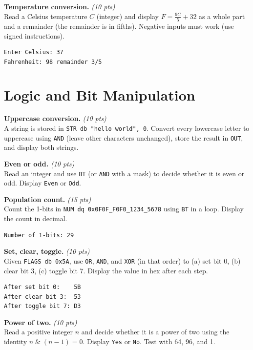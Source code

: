 \documentclass[11pt,letterpaper]{article}
\newcommand{\pts}[1]{\hfill\textit{(#1 pts)}}
\newcommand{\ttl}[1]{\textbf{#1.}}
\begin{document}
\begin{problems}
\item \ttl{Temperature conversion} \pts{10}
\\Read a Celsius temperature $C$ (integer) and display $F = \frac{9C}{5} + 32$ as a whole part and a remainder (the remainder is in fifths). Negative inputs must work (use signed instructions).
\begin{lstlisting}[style=out]
Enter Celsius: 37
Fahrenheit: 98 remainder 3/5
\end{lstlisting}

\end{problems}

\section{Logic and Bit Manipulation}

\begin{problems}

\item \ttl{Uppercase conversion} \pts{10}
\\A string is stored in \texttt{STR db "hello world", 0}. Convert every lowercase letter to uppercase using \texttt{AND} (leave other characters unchanged), store the result in \texttt{OUT}, and display both strings.

\item \ttl{Even or odd} \pts{10}
\\Read an integer and use \texttt{BT} (or \texttt{AND} with a mask) to decide whether it is even or odd. Display \texttt{Even} or \texttt{Odd}.

\item \ttl{Population count} \pts{15}
\\Count the 1-bits in \texttt{NUM dq 0x0F0F\_F0F0\_1234\_5678} using \texttt{BT} in a loop. Display the count in decimal.
\begin{lstlisting}[style=out]
Number of 1-bits: 29
\end{lstlisting}

\item \ttl{Set, clear, toggle} \pts{10}
\\Given \texttt{FLAGS db 0x5A}, use \texttt{OR}, \texttt{AND}, and \texttt{XOR} (in that order) to (a) set bit 0, (b) clear bit 3, (c) toggle bit 7. Display the value in hex after each step.
\begin{lstlisting}[style=out]
After set bit 0:    5B
After clear bit 3:  53
After toggle bit 7: D3
\end{lstlisting}

\item \ttl{Power of two} \pts{10}
\\Read a positive integer $n$ and decide whether it is a power of two using the identity $n \;\&\; (n-1) = 0$. Display \texttt{Yes} or \texttt{No}. Test with 64, 96, and 1.

\end{problems}
\end{document}
